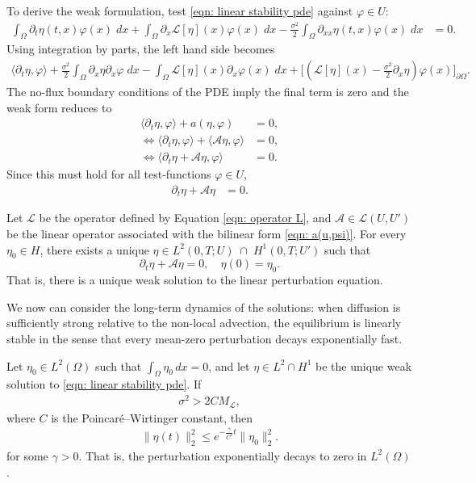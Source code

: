 \documentclass[10pt]{article}
\begin{document}
To derive the weak formulation, test \eqref{eqn: linear stability pde} against $\varphi \in U$:
\begin{align*}
    \int_\Omega \partial_t \eta(t,x)\varphi(x)\; dx + \int_\Omega \partial_x\mathcal{L}[\eta](x) \varphi(x) \; dx - \frac{\sigma^2}{2} \int_\Omega \partial_{xx} \eta(t,x) \varphi(x)\; dx &= 0.
\end{align*}
Using integration by parts, the left hand side becomes
\begin{align*}
    \langle \partial_t\eta, \varphi\rangle + \frac{\sigma^2}{2}\int_\Omega \partial_x \eta \partial_x \varphi\; dx - \int_\Omega \mathcal{L}[\eta](x) \partial_x\varphi(x)\; dx+ \Big[(\mathcal{L}[\eta](x) - \frac{\sigma^2}{2} \partial_x 
    \eta)\varphi(x)\Big]_{\partial\Omega}.
\end{align*}
The no-flux boundary conditions of the PDE imply the final term is zero and the weak form reduces to
\begin{align*}
    \langle \partial_t\eta, \varphi\rangle + a(\eta,\varphi) &= 0,\\
    \iff \langle \partial_t\eta, \varphi\rangle  + \langle \mathcal{A}\eta,\varphi\rangle &= 0,\\
    \iff \langle \partial_t\eta + \mathcal{A}\eta,\varphi\rangle &= 0.
\end{align*}
Since this must hold for all test-functions $\varphi \in U$,
\begin{align*}
    \partial_t\eta + \mathcal{A}\eta &= 0.
\end{align*}


\begin{theorem}\label{thm: solution to linear pertubation equation}
    Let $\mathcal{L}$ be the operator defined by Equation \eqref{eqn: operator L}, and $\mathcal{A} \in \mathcal{L}(U,U')$ be the linear operator associated with the bilinear form \eqref{eqn: a(u,psi)}. For every $\eta_0 \in H$, there exists a unique $\eta \in L^2(0,T;U)\; \cap\; H^1(0,T;U')$ such that $$\partial_t\eta + \mathcal{A}\eta = 0,\quad \eta(0) = \eta_0.$$
    That is, there is a unique weak solution to the linear perturbation equation.
\end{theorem}

We now can consider the long-term dynamics of the solutions: when diffusion is sufficiently strong relative to the non-local advection, the equilibrium is linearly stable in the sense that every mean-zero perturbation decays exponentially fast.
\begin{proposition}\label{prop: decaying perturbation}
    Let $\eta_0 \in L^2(\Omega)$ such that $\int_\Omega \eta_0 \, dx = 0$, and let $\eta \in L^2 \cap H^1$ be the unique weak solution to \eqref{eqn: linear stability pde}. If
    \begin{align*}
        \sigma^2 > 2CM_{\mathcal{L}},
    \end{align*}
    where $C$ is the Poincaré–Wirtinger constant, then
    \begin{align*}
        \|\eta(t)\|^2_2 \leq e^{-\frac{\gamma}{C^2}t} \|\eta_0\|_2^2.
    \end{align*}
    for some $\gamma>0$. That is, the perturbation exponentially decays to zero in $L^2(\Omega)$.
\end{proposition}
\end{document}
